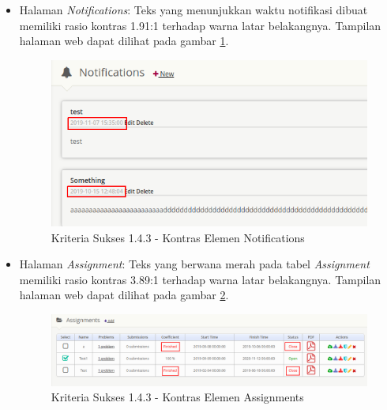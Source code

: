 \documentclass[a4paper,twoside]{article}
\begin{document}
\begin{enumerate}
\begin{itemize}
			\item Halaman \textit{Notifications}: Teks yang menunjukkan waktu notifikasi dibuat memiliki rasio kontras 1.91:1 terhadap warna latar belakangnya. Tampilan halaman web dapat dilihat pada gambar \ref{fig:kepatuhan_1_4_3_notifications}.
			\begin{figure}[H]
				\centering  
				\includegraphics[scale=0.5]{kepatuhan_1_4_3_notifications}  
				\caption[Kriteria Sukses 1.4.3 - Kontras Elemen Notifications]{Kriteria Sukses 1.4.3 - Kontras Elemen Notifications} 
				\label{fig:kepatuhan_1_4_3_notifications} 
			\end{figure}
		
			\pagebreak
			
			\item Halaman \textit{Assignment}: Teks yang berwana merah pada tabel \textit{Assignment} memiliki rasio kontras 3.89:1 terhadap warna latar belakangnya. Tampilan halaman web dapat dilihat pada gambar \ref{fig:kepatuhan_1_4_3_assignments}.
			\begin{figure}[H]
				\centering  
				\includegraphics[scale=0.3]{kepatuhan_1_4_3_assignments}  
				\caption[Kriteria Sukses 1.4.3 - Kontras Elemen Assignments]{Kriteria Sukses 1.4.3 - Kontras Elemen Assignments} 
				\label{fig:kepatuhan_1_4_3_assignments} 
			\end{figure}
			

\end{itemize}
\end{enumerate}
\end{document}
